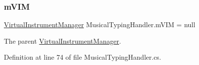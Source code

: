 \subsubsection{\texorpdfstring{m\+V\+IM}{mVIM}}
{\footnotesize\ttfamily \hyperlink{class_virtual_instrument_manager}{Virtual\+Instrument\+Manager} Musical\+Typing\+Handler.\+m\+V\+IM = null\hspace{0.3cm}{\ttfamily [private]}}



The parent \hyperlink{class_virtual_instrument_manager}{Virtual\+Instrument\+Manager}. 



Definition at line 74 of file Musical\+Typing\+Handler.\+cs.

